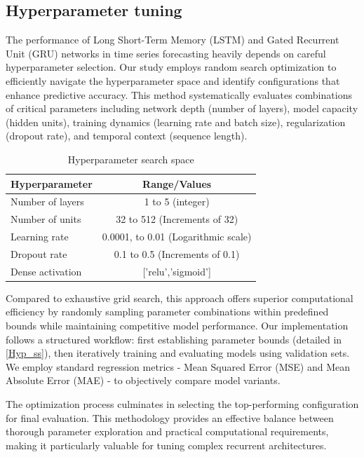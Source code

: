 \documentclass{dsfe}
\begin{document}
\subsection{Hyperparameter tuning}
The performance of Long Short-Term Memory (LSTM) and Gated Recurrent Unit (GRU) networks in time series forecasting heavily depends on careful hyperparameter selection. Our study employs random search optimization to efficiently navigate the hyperparameter space and identify configurations that enhance predictive accuracy. This method systematically evaluates combinations of critical parameters including network depth (number of layers), model capacity (hidden units), training dynamics (learning rate and batch size), regularization (dropout rate), and temporal context (sequence length).
\begin{table}[H]
\centering
\begin{tabular}{lc}
  \hline
  Hyperparameter & Range/Values \\ 
  \hline
   Number of layers & 1 to 5 (integer) \\ 
   Number of units & 32 to 512 (Increments of 32) \\ 
   Learning rate & 0.0001, to 0.01 (Logarithmic scale) \\ 
  Dropout rate & 0.1 to 0.5 (Increments of 0.1) \\ 
  Dense activation & ['relu','sigmoid'] \\ 
   \hline
\end{tabular}
\caption{Hyperparameter search space}\label{Hyp_ss}
\end{table}
Compared to exhaustive grid search, this approach offers superior computational efficiency by randomly sampling parameter combinations within predefined bounds while maintaining competitive model performance. Our implementation follows a structured workflow: first establishing parameter bounds (detailed in \autoref{Hyp_ss}), then iteratively training and evaluating models using validation sets. We employ standard regression metrics - Mean Squared Error (MSE) and Mean Absolute Error (MAE) - to objectively compare model variants.

The optimization process culminates in selecting the top-performing configuration for final evaluation. This methodology provides an effective balance between thorough parameter exploration and practical computational requirements, making it particularly valuable for tuning complex recurrent architectures.
\end{document}
